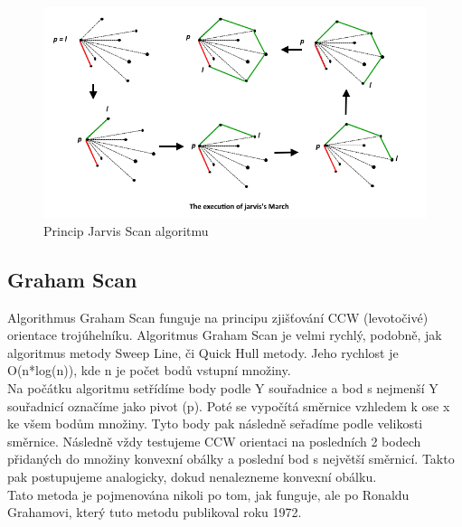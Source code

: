 \documentclass[a4paper,11pt,twoside]{article}
\begin{document}
\vspace{0.2cm}
\begin{figure}[hbt!] 
\begin{center}
\includegraphics[width=13cm]{pictures/jarvis.png} 
\caption[Princip Jarvis Scan algoritmu]{Princip Jarvis Scan algoritmu \cite{graham}}
\label{fig:graham}
\end{center}
\end{figure}
\vspace{-0.4cm}

\newpage
\vspace*{-1cm}
\subsection{Graham Scan}
Algorithmus Graham Scan funguje na principu zjišťování CCW (levotočivé) orientace trojúhelníku. Algoritmus Graham Scan je velmi rychlý, podobně, jak algoritmus metody Sweep Line, či Quick Hull metody.  Jeho rychlost je O(n*log(n)), kde n je počet bodů vstupní množiny. \\
\indent Na počátku algoritmu setřídíme body podle Y souřadnice a bod s nejmenší Y souřadnicí označíme jako pivot (p). Poté se vypočítá směrnice vzhledem k ose x ke všem bodům množiny. Tyto body pak následně seřadíme podle velikosti směrnice. Následně vždy testujeme CCW orientaci na posledních 2 bodech přidaných do množiny konvexní obálky a poslední bod s největší směrnicí. Takto pak postupujeme analogicky, dokud nenalezneme konvexní obálku. \\
\indent Tato metoda je pojmenována nikoli po tom, jak funguje, ale po Ronaldu Grahamovi, který tuto metodu publikoval roku 1972.
\end{document}
